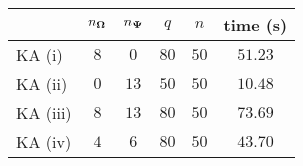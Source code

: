 \centering
\renewcommand{\arraystretch}{1.2}
\begin{tabular}{@{}lccccc@{}}
\toprule
 & $n_{\boldsymbol{\Omega}}$ & $n_{\boldsymbol{\Psi}}$ & $q$ & $n$ & time (s)\\
\midrule
KA (i) & $8$ & $0$ & $80$ & $50$ & $51.23$ \\
KA (ii) & $0$ & $13$ & $50$ & $50$ & $10.48$ \\
KA (iii) & $8$ & $13$ & $80$ & $50$ & $73.69$ \\
KA (iv) & $4$ & $6$ & $80$ & $50$ & $43.70$ \\
\bottomrule
\end{tabular}
